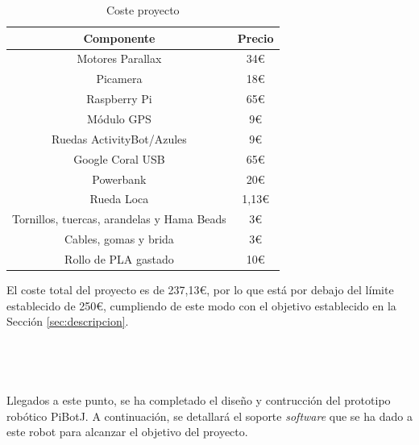 \begin{table}[H]
	\begin{center}
		\begin{tabular}{|c|c|}
			\hline
			Componente & Precio \\
			\hline
			Motores Parallax & 34€ \\
			\hline
			Picamera &  18€ \\
			\hline
			Raspberry Pi & 65€ \\
			\hline
			Módulo GPS & 9€ \\
			\hline
			Ruedas ActivityBot/Azules & 9€ \\
			\hline
			Google Coral USB & 65€ \\
			\hline
			Powerbank & 20€ \\
			\hline
			Rueda Loca & 1,13€ \\
			\hline
			Tornillos, tuercas, arandelas y Hama Beads & 3€ \\
			\hline
			Cables, gomas y brida & 3€ \\
			\hline
			Rollo de PLA gastado & 10€ \\
			\hline
		\end{tabular}
		\caption{Coste proyecto}
		\label{cuadro:costetotal}
	\end{center}
\end{table}

El coste total del proyecto es de 237,13€, por lo que está por debajo del límite establecido de 250€, cumpliendo de este modo con el objetivo establecido en la Sección \ref{sec:descripcion}.\\\\\\\\\\



Llegados a este punto, se ha completado el diseño y contrucción del prototipo robótico PiBotJ. A continuación, se detallará el soporte \textit{software} que se ha dado a este robot para alcanzar el objetivo del proyecto.

